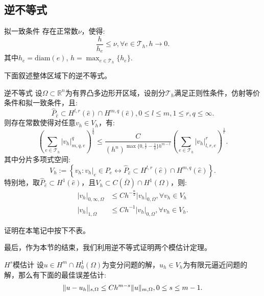 \subsection{逆不等式}
\begin{definition}{拟一致条件}
    存在正常数$\nu$，使得:
    \begin{equation}
        \frac{h}{h_{e}}\le\nu,\forall e\in\mathcal{T}_{h},h\rightarrow 0.
    \end{equation}
    其中$h_{e}=\text{diam}(e)$, $h=\max_{e\in\mathcal{T}_{h}}\{h_{e}\}$.
\end{definition}
下面叙述整体区域下的逆不等式。
\begin{theorem}{逆不等式}
    设$\Omega\subset\mathbb{R}^{n}$为有界凸多边形开区域，设剖分$\mathcal{T}_{h}$满足正则性条件，仿射等价条件和拟一致条件，且:
    \begin{equation}
        \hat{P}_{\hat{e}}\subset H^{l,r}(\hat{e})\cap H^{m,q}(\hat{e}), 0\le l\le m, 1\le r,q\le \infty.
    \end{equation}
    则存在常数使得对任意$v_{h}\in V_{h}$，有:
    \begin{equation}
        \left(\sum_{e\in\mathcal{T}_{h}}|v_{h}|_{m,q,e}^{q}\right)^{\frac{1}{q}}\le\frac{C}{(h^{n})^{\max\{0,\frac{1}{r}-\frac{1}{q}\}h^{m-l}}}\left(\sum_{e\in\mathcal{T}_{h}}|v_{h}|_{l,r,e}^{r}\right)^{\frac{1}{r}}.
    \end{equation}
    其中分片多项式空间:
    \begin{equation}
        V_{h}:=\left\{v_{h}:v_{h}|_{e}\in P_{e}\leftrightarrow \hat{P}_{\hat{e}}\subset H^{l,r}(\hat{e})\cap H^{m,q}(\hat{e})\right\}.
    \end{equation}
    特别地，取$\hat{P}_{\hat{e}}\subset H^{1}(\hat{e})$，且$V_{h}\subset C(\bar{\Omega})\cap H^{1}(\Omega)$，则:
    \begin{equation}
        \begin{aligned}
        |v_{h}|_{0,\infty,\Omega}&\le Ch^{-\frac{n}{2}}|v_{h}|_{0,\Omega},\forall v_{h}\in V_{h}\\
        |v_{h}|_{1,\Omega}&\le Ch^{-1}|v_{h}|_{0,\Omega},\forall v_{h}\in V_{h}.
        \end{aligned}
    \end{equation}
\end{theorem}
证明在本笔记中按下不表。

最后，作为本节的结束，我们利用逆不等式证明两个模估计定理。
\begin{theorem}{$H^{s}$模估计}
    设$u\in H^{m}\cap H_{0}^{1}(\Omega)$为变分问题的解，$u_{h}\in V_{h}$为有限元逼近问题的解，那么有下面的最佳误差估计:
    \begin{equation}
        \|u-u_{h}\|_{s,\Omega}\le Ch^{m-s}\|u\|_{m,\Omega},0\le s\le m-1.
    \end{equation}
\end{theorem}